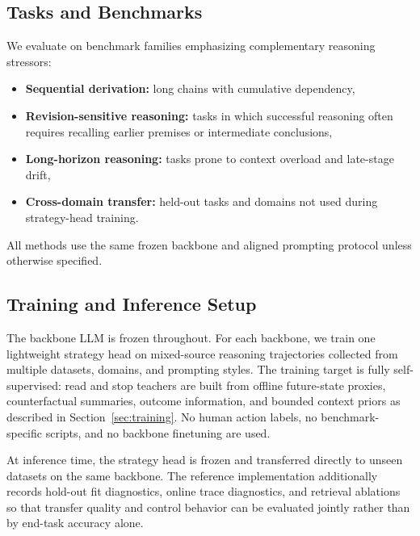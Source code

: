 \documentclass{article}
\begin{document}
\subsection{Tasks and Benchmarks}
We evaluate on benchmark families emphasizing complementary reasoning stressors:
\begin{itemize}[leftmargin=1.3em, itemsep=0.2em]
    \item \textbf{Sequential derivation:} long chains with cumulative dependency,
    \item \textbf{Revision-sensitive reasoning:} tasks in which successful reasoning often requires recalling earlier premises or intermediate conclusions,
    \item \textbf{Long-horizon reasoning:} tasks prone to context overload and late-stage drift,
    \item \textbf{Cross-domain transfer:} held-out tasks and domains not used during strategy-head training.
\end{itemize}
All methods use the same frozen backbone and aligned prompting protocol unless otherwise specified.

\subsection{Training and Inference Setup}
The backbone LLM is frozen throughout. For each backbone, we train one lightweight strategy head on mixed-source reasoning trajectories collected from multiple datasets, domains, and prompting styles. The training target is fully self-supervised: read and stop teachers are built from offline future-state proxies, counterfactual summaries, outcome information, and bounded context priors as described in Section~\ref{sec:training}. No human action labels, no benchmark-specific scripts, and no backbone finetuning are used.

At inference time, the strategy head is frozen and transferred directly to unseen datasets on the same backbone. The reference implementation additionally records hold-out fit diagnostics, online trace diagnostics, and retrieval ablations so that transfer quality and control behavior can be evaluated jointly rather than by end-task accuracy alone.
\end{document}
